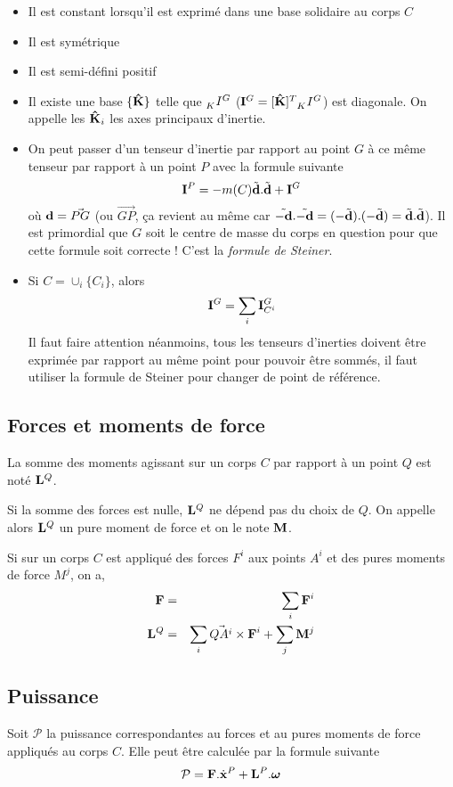 \documentclass[11pt,a4paper]{article} %
\newcommand\fv[1]{{\bf #1}} %
\newcommand\fvd[1]{\dot{\bf #1}} %
\newcommand\uk{{\bf\hat{K}}} %
\newcommand\wtr[3]{\tensor*[_{ #1}]{ #2}{^{ #3}}} %
\newcommand\omegaf{{\bm \omega}}
\newcommand\ine{{\bf I}}
\newcommand\st{{\bf L}}
\newcommand\pst{{\bf M}}
\newcommand\fo{{\bf F}}
\begin{document}
\begin{itemize}
	\item Il est constant lorsqu'il est exprimé dans une base solidaire au corps $C$
	\item Il est symétrique
	\item Il est semi-défini positif
	\item
		Il existe une base $\{\uk\}$ telle que $\wtr{K}{I}{G}$ ($\ine^G = [\uk]^T \wtr{K}{I}{G}$) est diagonale. On appelle les $\uk_i$ les axes principaux d'inertie.
	\item
		On peut passer d'un tenseur d'inertie par rapport au point $G$ à ce même tenseur par rapport à un point $P$ avec la formule suivante
		\[ \ine^P = -m(C)\tilde{\fv{d}}.\tilde{\fv{d}} + \ine^G \]
		où $\fv{d} = \vec{PG}$ (ou $\vec{GP}$, ça revient au même car $\tilde{-\fv{d}}.\tilde{-\fv{d}} = (-\tilde{\fv{d}}).(-\tilde{\fv{d}}) = \tilde{\fv{d}}.\tilde{\fv{d}}$).
		Il est primordial que $G$ soit le centre de masse du corps en question pour que cette formule soit correcte !
		C'est la {\em formule de Steiner}.
	\item
		Si $C = \cup_i \{C_i\}$, alors
		\[ \ine^G = \sum_i \ine_{C^i}^G \]
		Il faut faire attention néanmoins, tous les tenseurs d'inerties doivent être exprimée par rapport au même point pour pouvoir être sommés, il faut utiliser la formule de Steiner pour changer de point de référence.
\end{itemize}

\subsection{Forces et moments de force}
La somme des moments agissant sur un corps $C$ par rapport à un point $Q$ est noté $\st^Q$.

Si la somme des forces est nulle, $\st^Q$ ne dépend pas du choix de $Q$.
On appelle alors $\st^Q$ un pure moment de force et on le note $\pst$.

Si sur un corps $C$ est appliqué des forces $F^i$ aux points $A^i$ et des pures moments de force $M^j$, on a,%
\begin{eqnarray*}
	\fo &=& \sum_i \fo^i\\
	\st^Q &=&  \sum_i \vec{QA^i}\times\fo^i + \sum_j \pst^j
\end{eqnarray*}

\subsection{Puissance}
Soit $\mathcal{P}$ la puissance correspondantes au forces et au pures moments de force appliqués au corps $C$. Elle peut être calculée par la formule suivante
\[ \mathcal{P} = \fo.\fvd{x}^P + \st^P.\omegaf \]
\end{document}
